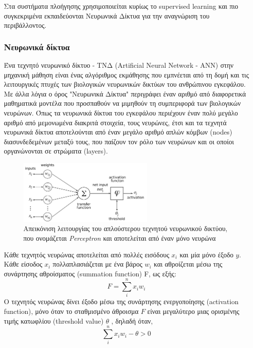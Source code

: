 Στα συστήματα πλοήγησης χρησιμοποιείται κυρίως το supervised learning και πιο συγκεκριμένα εκπαιδεύονται Νευρωνικά Δίκτυα για την αναγνώριση του περιβάλλοντος.

\subsubsection{Νευρωνικά δίκτυα}
Ένα τεχνητό νευρωνικό δίκτυο - ΤΝΔ (Artificial Neural Network - ANN) στην μηχανική μάθηση είναι ένας αλγόριθμος εκμάθησης που εμπνέεται από τη δομή και τις λειτουργικές πτυχές των βιολογικών νευρωνικών δικτύων του ανθρώπινου εγκεφάλου. Με άλλα λόγια ο όρος "Νευρωνικά Δίκτυα" περιγράφει έναν αριθμό από διαφορετικά μαθηματικά μοντέλα που προσπαθούν να μιμηθούν τη συμπεριφορά των βιολογικών νευρώνων. Όπως τα νευρωνικά δίκτυα του εγκεφάλου περιέχουν έναν πολύ μεγάλο αριθμό από μεμονωμένα διακριτά στοιχεία, τους νευρώνες, έτσι και τα τεχνητά νευρωνικά δίκτυα αποτελούνται από έναν μεγάλο αριθμό απλών κόμβων (nodes) διασυνδεδεμένων μεταξύ τους, που παίζουν τον ρόλο των νευρώνων και οι οποίοι οργανώνονται σε στρώματα (layers). 
\begin{figure}[H]
    \centering
    \includegraphics[width=0.6\textwidth]{images/art_neuron.png}
    \caption{Απεικόνιση λειτουργίας του απλούστερου τεχνητού νευρωνικού δικτύου, που ονομάζεται \textit{Perceptron} και αποτελείται από έναν μόνο νευρώνα}
    \label{fig:art-neuron}
\end{figure}
\hspace{1cm}
Κάθε τεχνητός νευρώνας αποτελείται από πολλές εισόδους $x_i$ και μία μόνο έξοδο $y$. Κάθε είσοδος $x_i$ πολλαπλασιάζεται με ένα βάρος $w_i$ και αθροίζεται μέσω της συνάρτησης αθροίσματος (summation function) F, ως εξής: \[F = \sum_{i}^{n} x_i w_i\] Ο τεχνητός νευρώνας δίνει έξοδο μέσω της συνάρτησης ενεργοποίησης (activation function), μόνο όταν το σταθμισμένο άθροισμα $F$ είναι μεγαλύτερο μιας ορισμένης τιμής κατωφλίου (threshold value) $\theta$ \cite{Grossi2008}, δηλαδή όταν, \[\sum_{i}^{n} x_i w_i - \theta > 0\]

